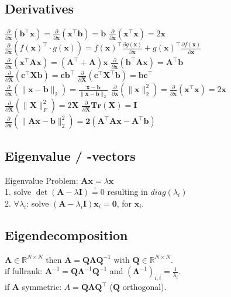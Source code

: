 \subsection*{Derivatives}
$\frac{\partial}{\partial \mathbf{x}}(\mathbf{b}^\top \mathbf{x}) = \frac{\partial}{\partial \mathbf{x}}(\mathbf{x}^\top \mathbf{b}) = \mathbf{b}$ \quad
$\frac{\partial}{\partial \mathbf{x}}(\mathbf{x}^\top \mathbf{x}) = 2\mathbf{x}$\\
$\frac{\partial}{\partial \mathbf{x}}(f(\mathbf{x})^\top\cdot g(\mathbf{x})) = f(\mathbf{x})^\top \frac{\partial g(\mathbf{x})}{\partial \mathbf{x}} + g(\mathbf{x})^\top \frac{\partial f(\mathbf{x})}{\partial \mathbf{x}}$\\
$\frac{\partial}{\partial \mathbf{x}}(\mathbf{x}^\top \mathbf{A}\mathbf{x}) = (\mathbf{A}^\top + \mathbf{A})\mathbf{x}$ \quad
$\frac{\partial}{\partial \mathbf{x}}(\mathbf{b}^\top \mathbf{A}\mathbf{x}) = \mathbf{A}^\top \mathbf{b}$\\
$\frac{\partial}{\partial \mathbf{X}}(\mathbf{c}^\top \mathbf{X} \mathbf{b}) = \mathbf{c}\mathbf{b}^\top$ \quad
$\frac{\partial}{\partial \mathbf{X}}(\mathbf{c}^\top \mathbf{X}^\top \mathbf{b}) = \mathbf{b}\mathbf{c}^\top$\\
$\frac{\partial}{\partial \mathbf{x}}(\| \mathbf{x}-\mathbf{b} \|_2) = \frac{\mathbf{x}-\mathbf{b}}{\|\mathbf{x}-\mathbf{b}\|_2}$ \quad
$\frac{\partial}{\partial \mathbf{x}}(\|\mathbf{x}\|^2_2) = \frac{\partial}{\partial \mathbf{x}} (\mathbf{x}^\top \mathbf{x}) = 2\mathbf{x}$\\
$\frac{\partial}{\partial \mathbf{X}}(\|\mathbf{X}\|_F^2) = 2\mathbf{X}$\quad
$\frac{\partial}{\partial \mathbf{X}} \mathbf{Tr}(\mathbf{X})=\mathbf{I}$ \\
$\frac{\partial}{\partial \mathbf{x}}(\|\mathbf{Ax - b}\|_2^2) = \mathbf{2(A^\top Ax-A^\top b)}$

\subsection*{Eigenvalue / -vectors}
Eigenvalue Problem: $\mathbf{Ax} = \lambda \mathbf{x}$\\
1. solve $\operatorname{det}(\mathbf{A} - \lambda \mathbf{I}) \overset{!}{=} 0$ resulting in $diag(\lambda_i)$\\
2. $\forall \lambda_i$:
solve $(\mathbf{A} - \lambda_i \mathbf{I}) \mathbf{x}_i = \mathbf{0}$, for $\mathbf{x}_i$.

\subsection*{Eigendecomposition}
$\mathbf{A} \in \mathbb{R}^{N \times N}$ then $\mathbf{A} = \mathbf{Q} \boldsymbol{\Lambda} \mathbf{Q}^{-1}$ with $\mathbf{Q} \in \mathbb{R}^{N \times N}$.\\
if fullrank: $\mathbf{A}^{-1} = \mathbf{Q} \boldsymbol{\Lambda}^{-1} \mathbf{Q}^{-1}$ and $(\boldsymbol{\Lambda}^{-1})_{i,i} = \frac{1}{\lambda_i}$.\\
if $\mathbf{A}$ symmetric: $A = \mathbf{Q} \boldsymbol{\Lambda} \mathbf{Q^\top}$ ($\mathbf{Q}$ orthogonal).

